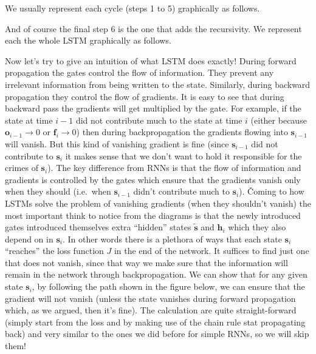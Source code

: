 We usually represent each cycle (steps 1 to 5) graphically as follows.


And of course the final step 6 is the one that adds the recursivity. We represent each the whole LSTM graphically as
follows.


Now let's try to give an intuition of what LSTM does exactly! During forward propagation the gates control the flow
of information. They prevent any irrelevant information from being written to the state. Similarly, during backward
propagation they control the flow of gradients. It is easy to see that during backward pass the gradients will get
multiplied by the gate. For example, if the state at time $i - 1$ did not contribute much to the state at time $i$
(either because $\boldsymbol{o}_{i-1} \to 0$ or $\boldsymbol{f}_{i} \to 0$) then during backpropagation the gradients
flowing into $\boldsymbol{s}_{i-1}$ will vanish. But this kind of vanishing gradient is fine (since
$\boldsymbol{s}_{i-1}$ did not contribute to $\boldsymbol{s}_{i}$ it makes sense that we don't want to hold it
responsible for the crimes of $\boldsymbol{s}_{i}$). The key difference from RNNs is that the flow of information and
gradients is controlled by the gates which ensure that the gradients vanish only when they should (i.e.\ when
$\boldsymbol{s}_{i-1}$ didn't contribute much to $\boldsymbol{s}_{i}$). \v

Coming to how LSTMs solve the problem of vanishing gradients (when they shouldn't vanish) the most important think to
notice from the diagrams is that the newly introduced gates introduced themselves extra ``hidden'' states
$\boldsymbol{\tilde{s}}$ and $\boldsymbol{h}_{i}$ which they also depend on in $\boldsymbol{s}_{i}$. In other words
there is a plethora of ways that each state $\boldsymbol{s}_{i}$ ``reaches'' the loss function $J$ in the end of the
network. It suffices to find just one that does not vanish, since that way we make sure that the information will
remain in the network through backpropagation. We can show that for any given state $\boldsymbol{s}_{i}$, by
following the path shown in the figure below, we can ensure that the gradient will not vanish (unless the state
vanishes during forward propagation which, as we argued, then it's fine). The calculation are quite straight-forward
(simply start from the loss and by making use of the chain rule stat propagating back) and very similar to the ones
we did before for simple RNNs, so we will skip them!

